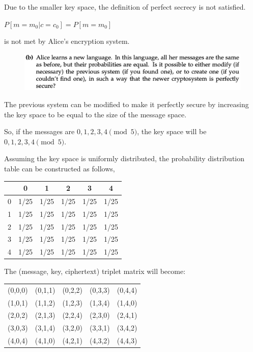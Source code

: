 \documentclass{ashoka-crypto}
\begin{document}
Due to the smaller key space, the definition of perfect secrecy is not satisfied.

\begin{math}
P[m = m_0|c = c_0] = P[m = m_0]
\end{math}

is not met by Alice's encryption system.

\clearpage

\begin{figure}[h]
\includegraphics[width=17cm]{5b}
\end{figure}

The previous system can be modified to make it perfectly secure by increasing the key space to be equal to the size of the message space.

So, if the messages are $0,1,2,3,4 \pmod {5}$, the key space will be $0,1,2,3,4 \pmod {5}$.

Assuming the key space is uniformly distributed, the probability distribution table can be constructed as follows,


\begin{table}[h]
\begin{tabular}{|c|ccccc|}
\hline
  & 0    & 1    & 2 & 3 & 4   \\
  \hline
0 & 1/25  & 1/25  & 1/25 & 1/25 & 1/25  \\
1 & 1/25  & 1/25  & 1/25 & 1/25 & 1/25  \\
2 & 1/25  & 1/25  & 1/25 & 1/25 & 1/25 \\
3 & 1/25  & 1/25  & 1/25 & 1/25 & 1/25 \\
4 & 1/25  & 1/25  & 1/25 & 1/25 & 1/25 \\
\hline
\end{tabular}
\centering
\end{table}

The (message, key, ciphertext) triplet matrix will become:

\begin{table}[h]
\begin{tabular}{ccccc}
(0,0,0)  & (0,1,1)  & (0,2,2) & (0,3,3) & (0,4,4)  \\
(1,0,1) & (1,1,2)  & (1,2,3) & (1,3,4) & (1,4,0)  \\
(2,0,2) & (2,1,3) & (2,2,4) & (2,3,0) & (2,4,1) \\
(3,0,3) & (3,1,4) & (3,2,0) & (3,3,1) & (3,4,2) \\
(4,0,4) & (4,1,0) & (4,2,1) & (4,3,2) & (4,4,3) \\
\end{tabular}
\centering
\end{table}
\end{document}
